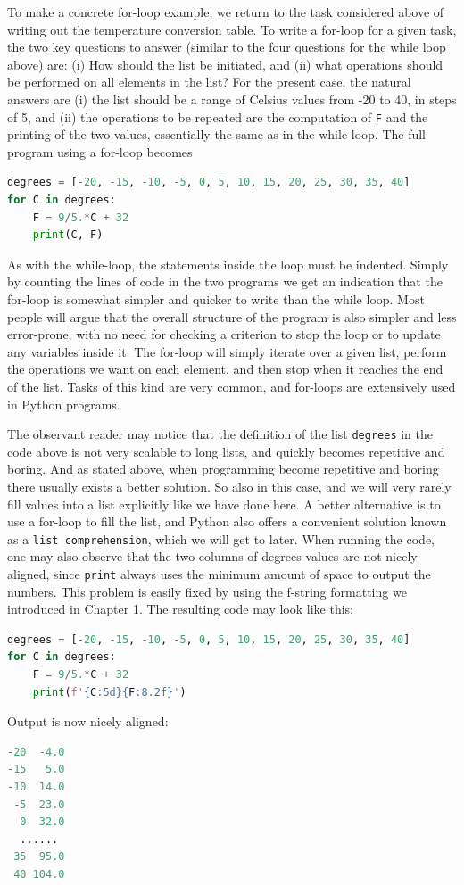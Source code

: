 \documentclass[graybox,envcountchap,sectrefs,final]{svmonodo}
\begin{document}
To make a concrete for-loop example, we return to the task considered above of writing out the temperature conversion table.
To write a for-loop for a given task, the two key questions to answer (similar to the
four questions for the while loop above) are: (i) How should the list be initiated, and (ii) what operations should be performed
on all elements in the list? For the present case, the natural answers are (i) the list should be a range of Celsius
values from -20 to 40, in steps of 5, and (ii) the operations to be repeated are the computation of \texttt{F} and the printing of the
two values, essentially the same as in the while loop. The full program using a for-loop becomes
\begin{lstlisting}[language=Python,style=blue1]
degrees = [-20, -15, -10, -5, 0, 5, 10, 15, 20, 25, 30, 35, 40]
for C in degrees:
    F = 9/5.*C + 32
    print(C, F)
\end{lstlisting}
As with the while-loop, the statements inside the loop must be indented. Simply by counting the lines of code in the two programs we get
an indication that the for-loop is somewhat simpler and quicker to write than the while loop.
Most people will argue that the overall structure of the
program is also simpler and less error-prone, with no need for checking a criterion to stop the loop or to update any variables inside
it. The for-loop will simply iterate over a given list, perform the operations we want on each element, and then stop when it reaches
the end of the list. Tasks of this kind are very common, and for-loops are extensively used in Python programs.

The observant reader may notice that the definition of the list \texttt{degrees} in the code above is not very scalable to long lists,
and quickly becomes repetitive and boring. And as stated above, when programming become repetitive and boring there usually exists
a better solution. So also in this case, and we will very rarely fill values into a list explicitly like we have done here. A better
alternative is to use a for-loop to fill the list, and Python also offers a convenient solution known as a \texttt{list comprehension}, which
we will get to later. When running the code, one may also observe that the two columns of degrees values are not nicely aligned, since
\texttt{print} always uses the minimum amount of space to output the numbers. This problem is easily fixed by using the f-string formatting
we introduced in Chapter 1. The resulting code may look like this:
\begin{lstlisting}[language=Python,style=blue1]
degrees = [-20, -15, -10, -5, 0, 5, 10, 15, 20, 25, 30, 35, 40]
for C in degrees:
    F = 9/5.*C + 32
    print(f'{C:5d}{F:8.2f}')
\end{lstlisting}
Output is now nicely aligned:
\begin{lstlisting}[language=Python,style=blue1]
-20  -4.0
-15   5.0
-10  14.0
 -5  23.0
  0  32.0
  ......
 35  95.0
 40 104.0
\end{lstlisting}
\end{document}
